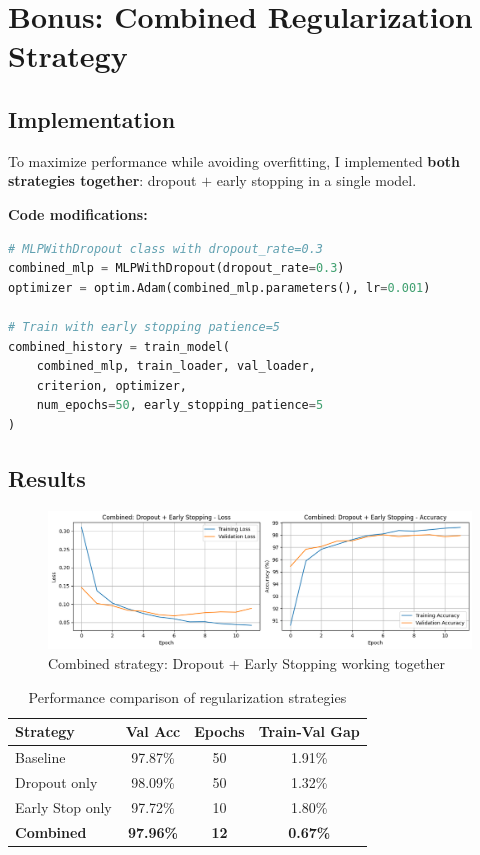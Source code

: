 \section{Bonus: Combined Regularization Strategy}

\subsection{Implementation}

To maximize performance while avoiding overfitting, I implemented \textbf{both strategies together}: dropout $+$ early stopping in a single model.

\textbf{Code modifications:}
\begin{lstlisting}[language=Python]
# MLPWithDropout class with dropout_rate=0.3
combined_mlp = MLPWithDropout(dropout_rate=0.3)
optimizer = optim.Adam(combined_mlp.parameters(), lr=0.001)

# Train with early stopping patience=5
combined_history = train_model(
    combined_mlp, train_loader, val_loader, 
    criterion, optimizer,
    num_epochs=50, early_stopping_patience=5
)
\end{lstlisting}

\subsection{Results}

\begin{figure}[h]
    \centering
    \includegraphics[width=0.7\linewidth]{section6/combined.png}
    \caption{Combined strategy: Dropout + Early Stopping working together}
    \label{fig:combined}
\end{figure}

\begin{table}[h]
\centering
\begin{tabular}{|l|c|c|c|}
\hline
\textbf{Strategy} & \textbf{Val Acc} & \textbf{Epochs} & \textbf{Train-Val Gap} \\ \hline
Baseline & 97.87\% & 50 & 1.91\% \\ \hline
Dropout only & 98.09\% & 50 & 1.32\% \\ \hline
Early Stop only & 97.72\% & 10 & 1.80\% \\ \hline
\textbf{Combined} & \textbf{97.96\%} & \textbf{12} & \textbf{0.67\%} \\ \hline
\end{tabular}
\caption{Performance comparison of regularization strategies}
\label{tab:combined-results}
\end{table}

